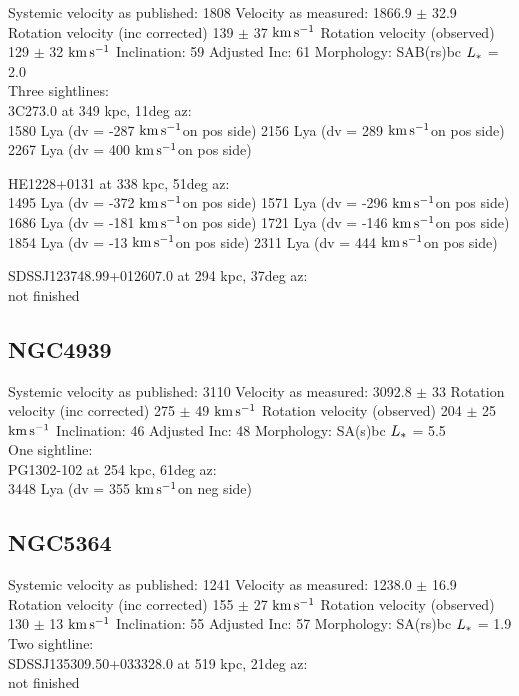 \documentclass[iop]{emulateapj-rtx4}
\newcommand{\kms}{$\rm km\, s^{-1}$}
\begin{document}

Systemic velocity as published: 1808
Velocity as measured: 1866.9 $\pm$ 32.9
Rotation velocity (inc corrected) 139 $\pm$ 37 \kms
Rotation velocity (observed) 129 $\pm$ 32 \kms
Inclination: 59
Adjusted Inc: 61
Morphology: SAB(rs)bc
$L_{\**}$ = 2.0 \\

Three sightlines: \\
3C273.0 at 349 kpc, 11deg az: \\
1580 Lya (dv = -287 \kms on pos side)
2156 Lya (dv = 289 \kms on pos side)
2267 Lya (dv = 400 \kms on pos side)


HE1228+0131 at 338 kpc, 51deg az: \\
1495 Lya (dv = -372 \kms on pos side)
1571 Lya (dv = -296 \kms on pos side)
1686 Lya (dv = -181 \kms on pos side)
1721 Lya (dv = -146 \kms on pos side)
1854 Lya (dv = -13 \kms on pos side)
2311 Lya (dv = 444 \kms on pos side)

SDSSJ123748.99+012607.0 at  294 kpc, 37deg az: \\
not finished


\subsection{NGC4939}
Systemic velocity as published: 3110
Velocity as measured: 3092.8 $\pm$ 33
Rotation velocity (inc corrected) 275 $\pm$ 49 \kms
Rotation velocity (observed) 204 $\pm$ 25 \kms
Inclination: 46
Adjusted Inc: 48
Morphology: SA(s)bc
$L_{\**}$ = 5.5 \\

One sightline: \\
PG1302-102 at 254 kpc, 61deg az: \\
3448 Lya (dv = 355 \kms on neg side)



\subsection{NGC5364}
Systemic velocity as published: 1241
Velocity as measured: 1238.0 $\pm$ 16.9
Rotation velocity (inc corrected) 155 $\pm$ 27 \kms
Rotation velocity (observed) 130 $\pm$ 13 \kms
Inclination: 55
Adjusted Inc: 57
Morphology: SA(rs)bc
$L_{\**}$ = 1.9 \\

Two sightline: \\
SDSSJ135309.50+033328.0 at 519 kpc, 21deg az: \\
not finished
\end{document}

